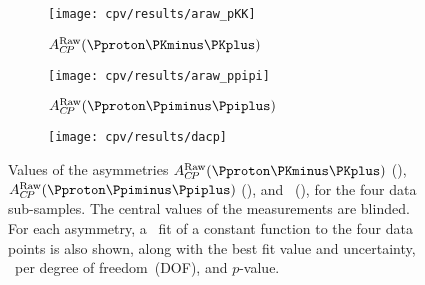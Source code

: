 \begin{figure}
  \begin{subfigure}[b]{0.5\textwidth}
    \texttt{[image: cpv/results/araw\_pKK]}
    \caption{$\ARaw(\pKK)$}
    \label{fig:cpv:results:asymmetries:pKK}
  \end{subfigure}
  \begin{subfigure}[b]{0.5\textwidth}
    \texttt{[image: cpv/results/araw\_ppipi]}
    \caption{$\ARaw(\ppipi)$}
    \label{fig:cpv:results:asymmetries:ppipi}
  \end{subfigure}

  \vspace{0.5cm}

  \begin{subfigure}[b]{\textwidth}
    \centering
    \texttt{[image: cpv/results/dacp]}
    \caption{\dACP}
    \label{fig:cpv:results:asymmetries:dacp}
  \end{subfigure}
  \caption{%
    Values of the asymmetries $\ARaw(\pKK)$ 
    (), $\ARaw(\ppipi)$ 
    (), and \dACP\ 
    (), for the four data 
    sub-samples.
    The central values of the measurements are blinded.
    For each asymmetry, a \chisq\ fit of a constant function to the four data 
    points is also shown, along with the best fit value and uncertainty, 
    \chisq\ per degree of freedom~(DOF), and $p$-value.
  }
  \label{fig:cpv:results:asymmetries}
\end{figure}
